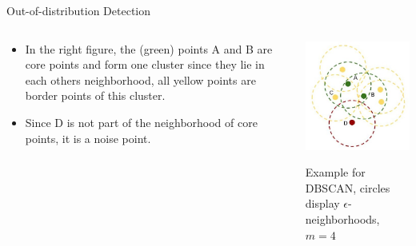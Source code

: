 \documentclass[11pt,compress,t,notes=noshow, aspectratio=169, xcolor=table]{beamer}
\begin{document}
\begin{frame}{Out-of-distribution Detection}
\vspace{-0.6cm}
\begin{columns}
	\begin{column}{0.68\textwidth}
		\begin{itemize}
			\item In the right figure, the (green) points A and B are core points and form one cluster since they lie in each others neighborhood, all yellow points are border points of this cluster. 
			\item Since D is not part of the neighborhood of core points, it is a noise point. 
		\end{itemize}
	\end{column}
	\begin{column}{0.27\textwidth}
		\vspace{-0.4cm}
		\begin{center}
			\includegraphics[width=1\textwidth]{figure/dbscan.jpg}
			
			\tiny{Example for DBSCAN, circles display $\epsilon$-neighborhoods, $m = 4$}
			

\end{center}
\end{column}
\end{columns}
\end{frame}
\end{document}
